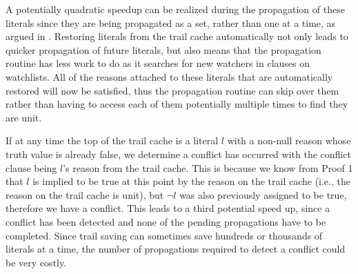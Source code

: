 \documentclass[runningheads]{llncs}
\begin{document}
A potentially quadratic speedup can be realized during the propagation
of these literals since they are being propagated as a set, rather
than one at a time, as argued in \cite{DBLP:conf/sat/HickeyB19,DBLP:journals/jair/Gent13}. Restoring literals from the trail cache
automatically not only leads to quicker propagation of future
literals, but also means that the propagation routine has less work to
do as it searches for new watchers in clauses on watchlists. All of
the reasons attached to these literals that are automatically restored
will now be satisfied, thus the propagation routine can skip over them
rather than having to access each of them potentially multiple times
to find they are unit.

If at any time the top of the trail cache is a literal $l$ with a
non-null reason whose truth value is already false, we determine a
conflict has occurred with the conflict clause being $l$'s reason from
the trail cache. This is because we know from Proof 1 that $l$ is
implied to be true at this point by the reason on the trail cache
(i.e., the reason on the trail cache is unit), but $\lnot l$ was also
previously assigned to be true, therefore we have a conflict. This
leads to a third potential speed up, since a conflict has been
detected and none of the pending propagations have to be
completed. Since trail saving can sometimes save hundreds or thousands
of literals at a time, the number of propagations required to detect a
conflict could be very costly.

\end{document}
